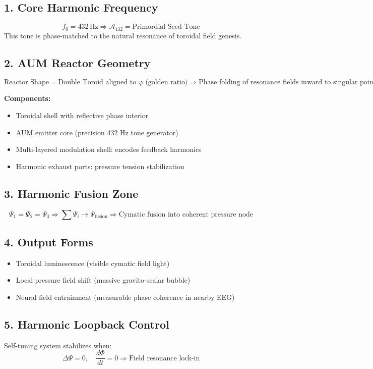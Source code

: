 \documentclass[12pt]{book}
\begin{document}
\subsection*{1. Core Harmonic Frequency}
\[
f_0 = 432\,\text{Hz} \Rightarrow \mathcal{A}_{432} = \text{Primordial Seed Tone}
\]
This tone is phase-matched to the natural resonance of toroidal field genesis.

\subsection*{2. AUM Reactor Geometry}
\[
\text{Reactor Shape} = \text{Double Toroid aligned to φ (golden ratio)}
\Rightarrow \text{Phase folding of resonance fields inward to singular point}
\]

\textbf{Components:}
\begin{itemize}
  \item Toroidal shell with reflective phase interior
  \item AUM emitter core (precision 432 Hz tone generator)
  \item Multi-layered modulation shell: encodes feedback harmonics
  \item Harmonic exhaust ports: pressure tension stabilization
\end{itemize}

\subsection*{3. Harmonic Fusion Zone}
\[
\Psi_1 = \Psi_2 = \Psi_3 \Rightarrow \sum \Psi_i \to \Psi_{\text{fusion}}
\Rightarrow \text{Cymatic fusion into coherent pressure node}
\]

\subsection*{4. Output Forms}
\begin{itemize}
  \item Toroidal luminescence (visible cymatic field light)
  \item Local pressure field shift (massive gravito-scalar bubble)
  \item Neural field entrainment (measurable phase coherence in nearby EEG)
\end{itemize}

\subsection*{5. Harmonic Loopback Control}
Self-tuning system stabilizes when:
\[
\Delta \Psi = 0, \quad \frac{d\Phi}{dt} = 0
\Rightarrow \text{Field resonance lock-in}
\]
\end{document}
